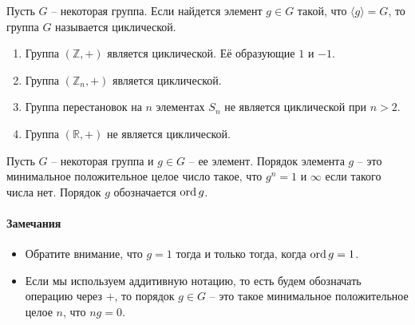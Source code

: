 \begin{definition}
Пусть $G$ -- некоторая группа.
Если найдется элемент $g\in G$ такой, что $\langle g\rangle = G$, то группа $G$ называется циклической.
\end{definition}


\begin{examples}
\begin{enumerate}
\item Группа $(\mathbb Z, +)$ является циклической.
Её образующие $1$ и $-1$.

\item Группа $(\mathbb Z_n, +)$ является циклической.

\item Группа перестановок на $n$ элементах $S_n$ не является циклической при $n > 2$.

\item Группа $(\mathbb R, +)$ не является циклической.
\end{enumerate}
\end{examples}

\begin{definition}
Пусть $G$ -- некоторая группа и $g\in G$ -- ее элемент.
Порядок элемента $g$ -- это минимальное положительное целое число такое, что $g^n = 1$ и $\infty$ если такого числа нет.
Порядок $g$ обозначается $\operatorname{ord} g$.
\end{definition}

\paragraph{Замечания}

\begin{itemize}
\item Обратите внимание, что $g  = 1$ тогда и только тогда, когда $\operatorname{ord} g = 1$.

\item Если мы используем аддитивную нотацию, то есть будем обозначать операцию через $+$, то порядок $g\in G$ -- это такое минимальное положительное целое $n$, что $n g = 0$.
\end{itemize}

